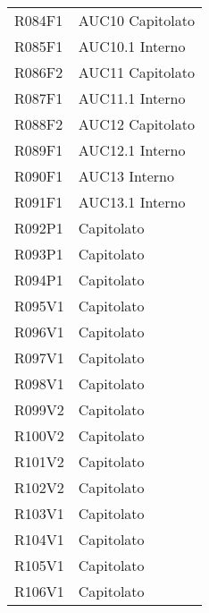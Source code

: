 \documentclass[../analisi-dei-requisiti.tex]{subfiles}
\begin{document}
\begin{longtable}[H]{ p{4cm} | p{4cm} }
  R084F1                               & AUC10 Capitolato              \\
  R085F1                               & AUC10.1 Interno               \\
  R086F2                               & AUC11 Capitolato              \\
  R087F1                               & AUC11.1 Interno               \\
  R088F2                               & AUC12 Capitolato              \\
  R089F1                               & AUC12.1 Interno               \\
  R090F1                               & AUC13 Interno                 \\
  R091F1                               & AUC13.1 Interno               \\
  R092P1                               & Capitolato                    \\
  R093P1                               & Capitolato                    \\
  R094P1                               & Capitolato                    \\
  R095V1                               & Capitolato                    \\
  R096V1                               & Capitolato                    \\
  R097V1                               & Capitolato                    \\
  R098V1                               & Capitolato                    \\
  R099V2                               & Capitolato                    \\
  R100V2                               & Capitolato                    \\
  R101V2                               & Capitolato                    \\
  R102V2                               & Capitolato                    \\
  R103V1                               & Capitolato                    \\
  R104V1                               & Capitolato                    \\
  R105V1                               & Capitolato                    \\
  R106V1                               & Capitolato                    \\

\end{longtable}
\end{document}
